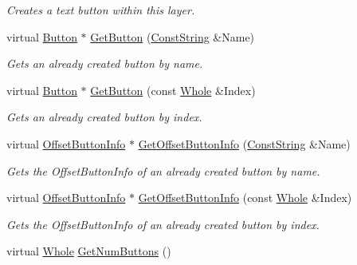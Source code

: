 \begin{DoxyCompactItemize}
\begin{DoxyCompactList}\small\item\em Creates a text button within this layer. \item\end{DoxyCompactList}\item 
virtual \hyperlink{classphys_1_1UI_1_1Button}{Button} $\ast$ \hyperlink{classphys_1_1UI_1_1Window_ab1152992cf6b636c8a4911889d930d9a}{GetButton} (\hyperlink{namespacephys_a5ce5049f8b4bf88d6413c47b504ebb31}{ConstString} \&Name)
\begin{DoxyCompactList}\small\item\em Gets an already created button by name. \item\end{DoxyCompactList}\item 
virtual \hyperlink{classphys_1_1UI_1_1Button}{Button} $\ast$ \hyperlink{classphys_1_1UI_1_1Window_aa0fb8f15e5a0ee2ac46631f56e23fa36}{GetButton} (const \hyperlink{namespacephys_a460f6bc24c8dd347b05e0366ae34f34a}{Whole} \&Index)
\begin{DoxyCompactList}\small\item\em Gets an already created button by index. \item\end{DoxyCompactList}\item 
virtual \hyperlink{structphys_1_1UI_1_1ResizingInfo}{OffsetButtonInfo} $\ast$ \hyperlink{classphys_1_1UI_1_1Window_ad0d6b12c2f69ea1bc580bba7e69949a5}{GetOffsetButtonInfo} (\hyperlink{namespacephys_a5ce5049f8b4bf88d6413c47b504ebb31}{ConstString} \&Name)
\begin{DoxyCompactList}\small\item\em Gets the OffsetButtonInfo of an already created button by name. \item\end{DoxyCompactList}\item 
virtual \hyperlink{structphys_1_1UI_1_1ResizingInfo}{OffsetButtonInfo} $\ast$ \hyperlink{classphys_1_1UI_1_1Window_a965b9fbfa8fa73b351f468a65ca73dcc}{GetOffsetButtonInfo} (const \hyperlink{namespacephys_a460f6bc24c8dd347b05e0366ae34f34a}{Whole} \&Index)
\begin{DoxyCompactList}\small\item\em Gets the OffsetButtonInfo of an already created button by index. \item\end{DoxyCompactList}\item 
virtual \hyperlink{namespacephys_a460f6bc24c8dd347b05e0366ae34f34a}{Whole} \hyperlink{classphys_1_1UI_1_1Window_a7eab9b4e1607a2b796072f60b6e3e0cd}{GetNumButtons} ()

\end{DoxyCompactItemize}
